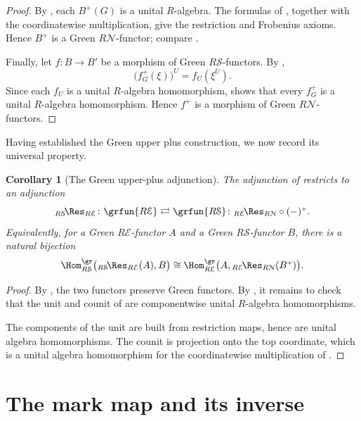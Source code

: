 \documentclass{amsart}
\numberwithin{equation}{section}%
\newtheorem{Cor}[equation]{Corollary}
\theoremstyle{remark}
\theoremstyle{definition}
\newcommand{\e}{\mathcal E}
\newcommand{\s}{\mathcal S}
\newcommand{\n}{\mathcal N}
\newcommand{\iRes}[2]{{}_{#1}\!\Res_{#2}}
\begin{document}
%
\begin{proof}
By , each $B^+(G)$ is a unital
$R$-algebra. The formulas of ,
together with the coordinatewise multiplication, give the
restriction and Frobenius axioms. Hence $B^+$ is a Green
$R\n$-functor; compare
\cite[Theorem~7.3(b)]{BoltjeRaggiCardenasValeroElizondo19}.

Finally, let $f\colon B\to B'$ be a morphism of Green
$R\s$-functors. By ,
\[
\bigl(f_G^+(\xi)\bigr)^U=f_U(\xi^U).
\]
Since each $f_U$ is a unital $R$-algebra homomorphism,
 shows that every $f_G^+$ is a
unital $R$-algebra homomorphism. Hence $f^+$ is a morphism of
Green $R\n$-functors.
\end{proof}
%
Having established the Green upper plus construction, we now record
its universal property.
%
\begin{Cor}[The Green upper-plus adjunction]
\label{cor:upper-plus-Green-adjunction}
The adjunction of  restricts to an
adjunction
%
\[
\iRes{R\s}{R\e}
\colon
\grfun{R\e}
\rightleftarrows
\grfun{R\s}
\colon
\iRes{R\e}{R\n}\circ(-)^{\scriptscriptstyle+}.
\]
%
Equivalently, for a Green $R\e$-functor $A$ and a Green
$R\s$-functor $B$, there is a natural bijection
%
\[
\Hom_{R\s}^{\gr}
\bigl(
\iRes{R\s}{R\e}(A),B
\bigr)
\cong
\Hom_{R\e}^{\gr}
\bigl(
A,\iRes{R\e}{R\n}(\Bup)
\bigr).
\]
%
\end{Cor}
%
\begin{proof}
By
,
the two functors preserve Green functors.
By , it remains to check that the
unit and counit of  are
componentwise unital $R$-algebra homomorphisms.

The components of the unit are built from restriction maps, hence
are unital algebra homomorphisms. The counit is projection onto the
top coordinate, which is a unital algebra homomorphism for the
coordinatewise multiplication of
.
\end{proof}



%
%
\section{The mark map and its inverse}
\label{sec:mark-map}
%
\end{document}
